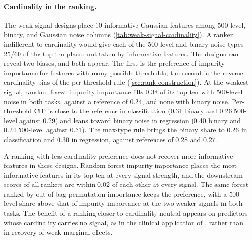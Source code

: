 \paragraph{Cardinality in the ranking.}
The weak-signal designs place 10 informative Gaussian features among
500-level, binary, and Gaussian noise columns
(\cref{tab:weak-signal-cardinality}). A ranker indifferent to cardinality would
give each of the 500-level and binary noise types 25/60 of the top-ten places
not taken by informative features. The designs can reveal two biases, and both
appear. The first is the preference of impurity importance for features with
many possible thresholds; the second is the reverse cardinality bias of the
per-threshold rule (\cref{sec:rank-construction}). At the weakest signal, random forest impurity importance fills
0.38 of its top ten with 500-level noise in both tasks, against a reference of
0.24, and none with binary noise. Per-threshold CIF is close to the reference
in classification (0.31 binary and 0.26 500-level against 0.29) and leans
toward binary noise in regression (0.40 binary and 0.24 500-level against
0.31). The max-type rule brings the binary share to 0.26 in classification and
0.30 in regression, against references of 0.28 and 0.27.

A ranking with less cardinality preference does not recover more informative
features in these designs. Random forest impurity
importance places the most informative features in its top ten at every signal
strength, and the downstream scores of all rankers are within 0.02 of each
other at every signal. The same forest ranked by out-of-bag permutation
importance keeps the preference, with a 500-level share above that of
impurity importance at the two weaker signals in both tasks. The benefit of a
ranking closer to cardinality-neutral appears on predictors whose cardinality
carries no signal, as in the clinical application of
\citet{MilletichDownesHirst2026citrees}, rather than in recovery of weak
marginal effects.

